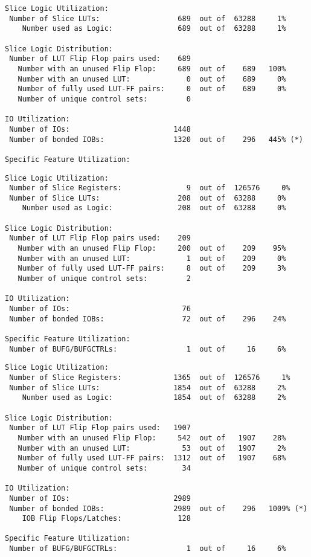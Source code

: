 \begin{verbatim}
Slice Logic Utilization: 
 Number of Slice LUTs:                  689  out of  63288     1%  
    Number used as Logic:               689  out of  63288     1%  

Slice Logic Distribution: 
 Number of LUT Flip Flop pairs used:    689
   Number with an unused Flip Flop:     689  out of    689   100%  
   Number with an unused LUT:             0  out of    689     0%  
   Number of fully used LUT-FF pairs:     0  out of    689     0%  
   Number of unique control sets:         0

IO Utilization: 
 Number of IOs:                        1448
 Number of bonded IOBs:                1320  out of    296   445% (*) 

Specific Feature Utilization:
\end{verbatim}

\begin{verbatim}
Slice Logic Utilization: 
 Number of Slice Registers:               9  out of  126576     0%  
 Number of Slice LUTs:                  208  out of  63288     0%  
    Number used as Logic:               208  out of  63288     0%  

Slice Logic Distribution: 
 Number of LUT Flip Flop pairs used:    209
   Number with an unused Flip Flop:     200  out of    209    95%  
   Number with an unused LUT:             1  out of    209     0%  
   Number of fully used LUT-FF pairs:     8  out of    209     3%  
   Number of unique control sets:         2

IO Utilization: 
 Number of IOs:                          76
 Number of bonded IOBs:                  72  out of    296    24%  

Specific Feature Utilization:
 Number of BUFG/BUFGCTRLs:                1  out of     16     6%  
\end{verbatim}

\begin{verbatim}
Slice Logic Utilization: 
 Number of Slice Registers:            1365  out of  126576     1%  
 Number of Slice LUTs:                 1854  out of  63288     2%  
    Number used as Logic:              1854  out of  63288     2%  

Slice Logic Distribution: 
 Number of LUT Flip Flop pairs used:   1907
   Number with an unused Flip Flop:     542  out of   1907    28%  
   Number with an unused LUT:            53  out of   1907     2%  
   Number of fully used LUT-FF pairs:  1312  out of   1907    68%  
   Number of unique control sets:        34

IO Utilization: 
 Number of IOs:                        2989
 Number of bonded IOBs:                2989  out of    296   1009% (*) 
    IOB Flip Flops/Latches:             128

Specific Feature Utilization:
 Number of BUFG/BUFGCTRLs:                1  out of     16     6%  
\end{verbatim}

